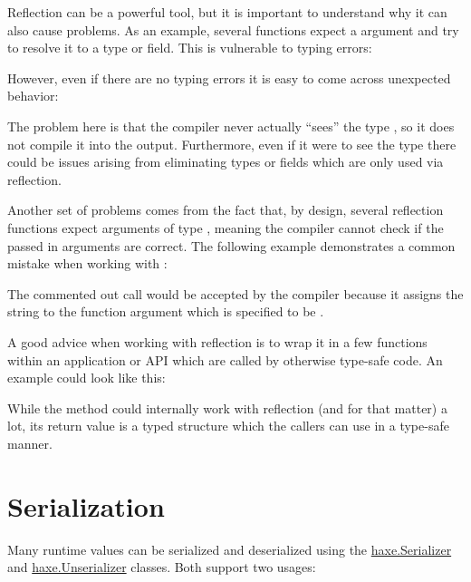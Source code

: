 Reflection can be a powerful tool, but it is important to understand why it can also cause problems. As an example, several functions expect a  argument and try to resolve it to a type or field. This is vulnerable to typing errors:


However, even if there are no typing errors it is easy to come across unexpected behavior:


The problem here is that the compiler never actually ``sees'' the type , so it does not compile it into the output. Furthermore, even if it were to see the type there could be issues arising from  eliminating types or fields which are only used via reflection.

Another set of problems comes from the fact that, by design, several reflection functions expect arguments of type , meaning the compiler cannot check if the passed in arguments are correct. The following example demonstrates a common mistake when working with :


The commented out call would be accepted by the compiler because it assigns the string  to the function argument  which is specified to be .

A good advice when working with reflection is to wrap it in a few functions within an application or API which are called by otherwise type-safe code. An example could look like this:


While the method  could internally work with reflection (and  for that matter) a lot, its return value is a typed structure which the callers can use in a type-safe manner.


\section{Serialization}
\label{std-serialization}

Many runtime values can be serialized and deserialized using the \href{https://api.haxe.org/haxe/Serializer.html}{haxe.Serializer} and \href{https://api.haxe.org/haxe/Unserializer.html}{haxe.Unserializer} classes. Both support two usages:


